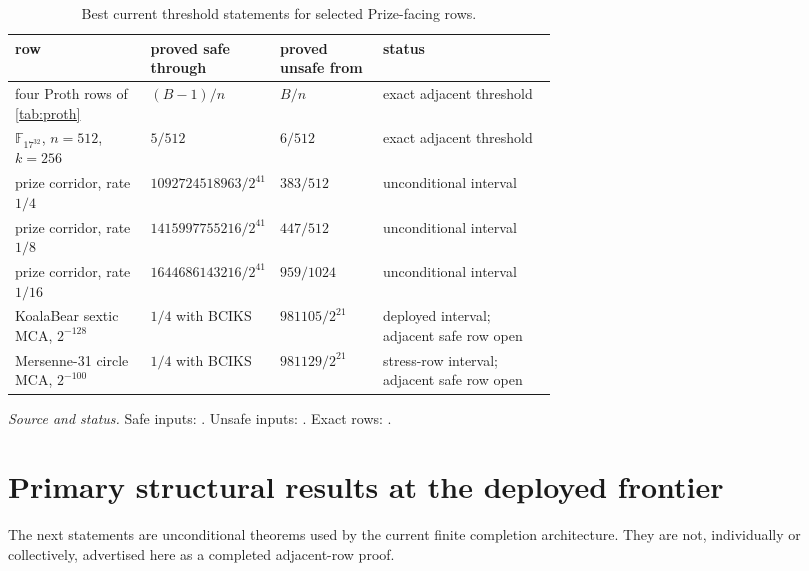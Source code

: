 \documentclass[11pt,a4paper]{amsart}
\numberwithin{equation}{section}
\theoremstyle{remark}
\newcommand{\F}{\mathbb F}
\newcommand{\source}[1]{\par\smallskip\noindent\textit{Source and status.} #1\par}
\begin{document}
\begin{table}[ht]
\centering
\caption{Best current threshold statements for selected Prize-facing rows.}
\label{tab:threshold-map}
\small
\begin{tabularx}{\textwidth}{@{}p{0.25\linewidth}p{0.19\linewidth}p{0.19\linewidth}X@{}}
\toprule
row & proved safe through & proved unsafe from & status\\
\midrule
four Proth rows of \cref{tab:proth} & $(B-1)/n$ & $B/n$ & exact adjacent threshold\\
$\F_{17^{32}}$, $n=512$, $k=256$ & $5/512$ & $6/512$ & exact adjacent threshold\\
prize corridor, rate $1/4$ & $1092724518963/2^{41}$ & $383/512$ & unconditional interval\\
prize corridor, rate $1/8$ & $1415997755216/2^{41}$ & $447/512$ & unconditional interval\\
prize corridor, rate $1/16$ & $1644686143216/2^{41}$ & $959/1024$ & unconditional interval\\
KoalaBear sextic MCA, $2^{-128}$ & $1/4$ with BCIKS & $981105/2^{21}$ & deployed interval; adjacent safe row open\\
Mersenne-31 circle MCA, $2^{-100}$ & $1/4$ with BCIKS & $981129/2^{21}$ & stress-row interval; adjacent safe row open\\
\bottomrule
\end{tabularx}
\end{table}
\source{Safe inputs: \cite{BCIKS20,Corridor26}.  Unsafe inputs: \cite{ChoCap26}.  Exact rows: \cite{ChoShort26,ChoThresholds26,F17Threshold26}.}

\section{Primary structural results at the deployed frontier}

The next statements are unconditional theorems used by the current finite completion architecture.  They are not, individually or collectively, advertised here as a completed adjacent-row proof.
\end{document}
